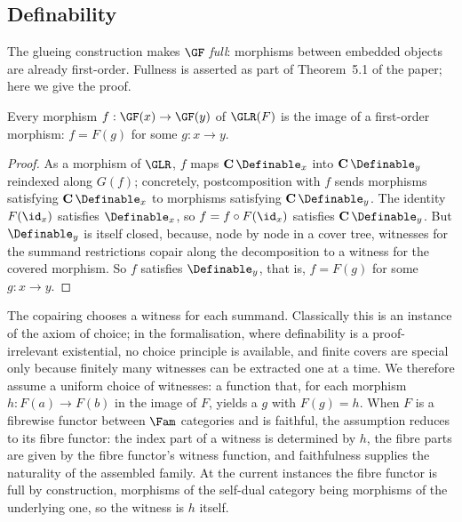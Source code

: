 \subsection{Definability}
\label{sec:conservativity:definability}

The glueing construction makes $\GF$ \emph{full}: morphisms between embedded objects are
already first-order. Fullness is asserted as part of Theorem~5.1 of the paper; here we give the proof.

\begin{lemma}[Fullness]
\label{lem:conservativity:definability}
Every morphism $f : \GF(x) \to \GF(y)$ of $\GLR(F)$ is the image of a first-order morphism: $f = F(g)$
for some $g : x \to y$.
\end{lemma}

\begin{proof}
As a morphism of $\GLR$, $f$ maps $\mathbf{C}\,\Definable_x$ into $\mathbf{C}\,\Definable_y$ reindexed along
$G(f)$; concretely, postcomposition with $f$ sends morphisms satisfying $\mathbf{C}\,\Definable_x$ to
morphisms satisfying $\mathbf{C}\,\Definable_y$. The identity $F(\id_x)$ satisfies $\Definable_x$, so $f = f
\circ F(\id_x)$ satisfies $\mathbf{C}\,\Definable_y$. But $\Definable_y$ is itself closed, because, node by
node in a cover tree, witnesses for the summand restrictions copair along the decomposition to a witness
for the covered morphism. So $f$ satisfies $\Definable_y$, that is, $f = F(g)$ for some $g : x \to y$.
\end{proof}

The copairing chooses a witness for each summand. Classically this is an instance of the axiom
of choice; in the formalisation, where definability is a proof-irrelevant existential, no choice
principle is available, and finite covers are special only because finitely many witnesses can
be extracted one at a time. We therefore assume a uniform choice of witnesses: a function that,
for each morphism $h : F(a) \to F(b)$ in the image of $F$, yields a $g$ with $F(g) = h$. When
$F$ is a fibrewise functor between $\Fam$ categories and is faithful, the assumption reduces to
its fibre functor: the index part of a witness is determined by $h$, the fibre parts are given
by the fibre functor's witness function, and faithfulness supplies the naturality of the
assembled family. At the current instances the fibre functor is full by construction, morphisms
of the self-dual category being morphisms of the underlying one, so the witness is $h$ itself.

